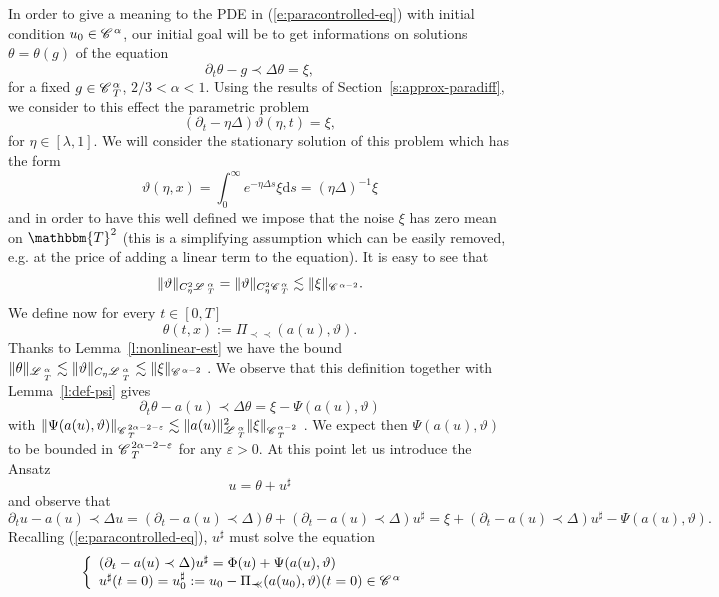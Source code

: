 \documentclass[11pt,reqno]{amsart}
\newcommand{\assign}{:=}
\newcommand{\mathd}{\mathrm{d}}
\newcommand{\precprec}{\prec\!\!\!\prec}
\newcommand{\CC}{\mathscr{C} \hspace{.1em}}
\newcommand{\LL}{\mathscr{L} \hspace{.2em}}
\begin{document}
In order to give a meaning to the PDE in (\ref{e:paracontrolled-eq}) with
initial condition $u_0 \in \CC^{\alpha}$, our initial goal will be to get
informations on solutions $\theta = \theta (g)$ of the equation
\[ \partial_t \theta - g \prec \Delta \theta = \xi, \]
for a fixed $g \in \CC^{\alpha}_T$, $2 / 3 < \alpha < 1$. Using the results of
Section~\ref{s:approx-paradiff}, we consider to this effect the parametric
problem
\[ (\partial_t - \eta \Delta) \vartheta (\eta, t) = \xi, \]
for $\eta \in [\lambda, 1]$. We will consider the stationary solution of this
problem which has the form
\begin{equation}
  \vartheta (\eta, x) = \int_0^{\infty} e^{- \eta \Delta s} \xi \mathd s =
  (\eta \Delta)^{- 1} \xi \label{eq:def-theta}
\end{equation}
and in order to have this well defined we impose that the noise $\xi$ has zero
mean on $\mathbbm{T}^2$ (this is a simplifying assumption which can be easily
removed, e.g. at the price of adding a linear term to the equation). It is
easy to see that
\begin{equation}
  \| \vartheta \|_{C_{\eta}^2 \LL^{\alpha}_T} = \| \vartheta \|_{C_{\eta}^2
  \CC^{\alpha}_T} \lesssim \| \xi \|_{\CC^{\alpha - 2}} .
  \label{eq:vartheta-est} 
\end{equation}
We define now for every $t \in [0, T]$
\[ \theta (t, x) \assign \Pi_{\precprec} (a (u), \vartheta) . \]
Thanks to Lemma~\ref{l:nonlinear-est} we have the bound $\| \theta
\|_{\LL^{\alpha}_{_T}} \lesssim \| \vartheta \|_{C_{\eta} \LL^{\alpha}_{_T}}
\lesssim \| \xi \|_{\CC^{\alpha - 2}}$ . We observe that this definition
together with Lemma~\ref{l:def-psi} gives
\[ \partial_t \theta - a (u) \prec \Delta \theta = \xi - \Psi (a (u),
   \vartheta) \]
with $\| \Psi (a (u), \vartheta) \|_{\CC^{2 \alpha - 2 - \varepsilon}_T}
\lesssim \| a (u) \|^2_{\LL^{\alpha}_T} \| \xi \|_{\CC^{\alpha - 2}_T}$ . We
expect then $\Psi (a (u), \vartheta)$ to be bounded in $\CC^{2 \alpha - 2 -
\varepsilon}_T$ for any $\varepsilon > 0$. At this point let us introduce the
Ansatz
\begin{equation}
  u = \theta + u^{\sharp}  \label{e:firstansatz}
\end{equation}
and observe that
\[ \partial_t u - a (u) \prec \Delta u = (\partial_t - a (u) \prec \Delta)
   \theta + (\partial_t - a (u) \prec \Delta) u^{\sharp} = \xi + (\partial_t -
   a (u) \prec \Delta) u^{\sharp} - \Psi (a (u), \vartheta) . \]
Recalling (\ref{e:paracontrolled-eq}), $u^{\sharp}$ must solve the equation
\begin{equation}
  \left\{ \begin{array}{l}
    (\partial_t - a (u) \prec \Delta) u^{\sharp} = \Phi (u) + \Psi (a (u),
    \vartheta)\\
    u^{\sharp} (t = 0) = u^{\sharp}_0 \assign u_0 - \Pi_{\precprec} (a (u_0),
    \vartheta) (t = 0) \in \CC^{\alpha}
  \end{array} \right. \label{e:usharp-equadiff} \qquad
\end{equation}
\end{document}
